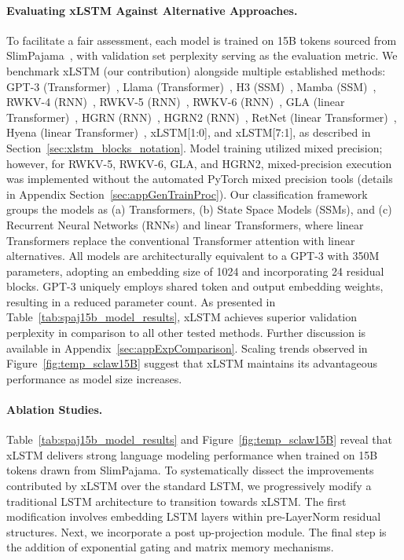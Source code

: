 \paragraph{Evaluating xLSTM Against Alternative Approaches.} To facilitate a fair assessment, each model is trained on 15B tokens sourced from SlimPajama~\citep{Soboleva:23}, with validation set perplexity serving as the evaluation metric. We benchmark xLSTM (our contribution) alongside multiple established methods: GPT-3 (Transformer)~\citep{Brown:20short}, Llama (Transformer)~\citep{Touvron:23arxiv}, H3 (SSM)~\citep{Fu:23}, Mamba (SSM)~\citep{Gu:24arxiv}, RWKV-4 (RNN)~\citep{Peng:23arxivshort}, RWKV-5 (RNN)~\citep{Peng:24arxivshort}, RWKV-6 (RNN)~\citep{Peng:24arxivshort}, GLA (linear Transformer)~\citep{Yang:23arxiv}, HGRN (RNN)~\citep{Qin:23}, HGRN2 (RNN)~\citep{Qin:24arxiv}, RetNet (linear Transformer)~\citep{Sun:23arxiv}, Hyena (linear Transformer)~\citep{Poli:23}, xLSTM[1:0], and xLSTM[7:1], as described in Section~\ref{sec:xlstm_blocks_notation}. Model training utilized mixed precision; however, for RWKV-5, RWKV-6, GLA, and HGRN2, mixed-precision execution was implemented without the automated PyTorch mixed precision tools (details in Appendix Section~\ref{sec:appGenTrainProc}). Our classification framework groups the models as (a) Transformers, (b) State Space Models (SSMs), and (c) Recurrent Neural Networks (RNNs) and linear Transformers, where linear Transformers replace the conventional Transformer attention with linear alternatives. All models are architecturally equivalent to a GPT-3 with 350M parameters, adopting an embedding size of 1024 and incorporating 24 residual blocks. GPT-3 uniquely employs shared token and output embedding weights, resulting in a reduced parameter count. As presented in Table~\ref{tab:spaj15b_model_results}, xLSTM achieves superior validation perplexity in comparison to all other tested methods. Further discussion is available in Appendix~\ref{sec:appExpComparison}. Scaling trends observed in Figure~\ref{fig:temp_sclaw15B} suggest that xLSTM maintains its advantageous performance as model size increases.

\paragraph{Ablation Studies.}
Table~\ref{tab:spaj15b_model_results} and Figure~\ref{fig:temp_sclaw15B} reveal that xLSTM delivers strong language modeling performance when trained on 15B tokens drawn from SlimPajama. To systematically dissect the improvements contributed by xLSTM over the standard LSTM, we progressively modify a traditional LSTM architecture to transition towards xLSTM. The first modification involves embedding LSTM layers within pre-LayerNorm residual structures. Next, we incorporate a post up-projection module. The final step is the addition of exponential gating and matrix memory mechanisms.

